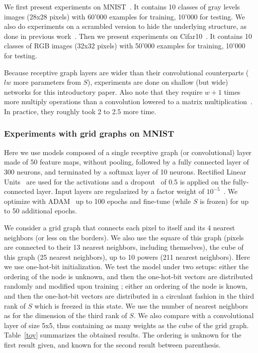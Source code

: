 We first present experiments on MNIST~\cite{lecun1998mnist}. It contains 10 classes of gray levels images (28x28 pixels) with 60'000 examples for training, 10'000 for testing. We also do experiments on a scrambled version to hide the underlying structure, as done in previous work~\cite{chen2014unsupervised}. Then we present experiments on Cifar10~\cite{krizhevsky2009learning}. It contains 10 classes of RGB images (32x32 pixels) with 50'000 examples for training, 10'000 for testing.

Because receptive graph layers are wider than their convolutional counterparts ($lw$ more parameters from $S$), experiments are done on shallow (but wide) networks for this introductory paper. Also note that they require $w+1$ times more multiply operations than a convolution lowered to a matrix multiplication~\cite{chetlur2014cudnn}. In practice, they roughly took 2 to 2.5 more time.

\subsubsection*{Experiments with grid graphs on MNIST}

Here we use models composed of a single receptive graph (or convolutional) layer made of 50 feature maps, without pooling, followed by a fully connected layer of 300 neurons, and terminated by a softmax layer of 10 neurons. Rectified Linear Units~\cite{glorot2011deep} are used for the activations and a dropout~\cite{srivastava2014dropout} of 0.5 is applied on the fully-connected layer. Input layers are regularized by a factor weight of $10^{-5}$~\cite{ng2004feature}. We optimize with ADAM~\cite{kingma2014adam} up to 100 epochs and fine-tune (while $S$ is frozen) for up to 50 additional epochs.

We consider a grid graph that connects each pixel to itself and its 4 nearest neighbors (or less on the borders). We also use the square of this graph (pixels are connected to their 13 nearest neighbors, including themselves), the cube of this graph (25 nearest neighbors), up to 10 powers (211 nearest neighbors).
Here we use one-hot-bit initialization. We test the model under two setups: either the ordering of the node is unknown, and then the one-hot-bit vectors are distributed randomly and modified upon training ; either an ordering of the node is known, and then the one-hot-bit vectors are distributed in a circulant fashion in the third rank of $S$ which is freezed in this state. We use the number of nearest neighbors as for the dimension of the third rank of $S$.
We also compare with a convolutional layer of size 5x5, thus containing as many weights as the cube of the grid graph. Table~\ref{toy} summarizes the obtained results. The ordering is unknown for the first result given, and known for the second result between parenthesis.

